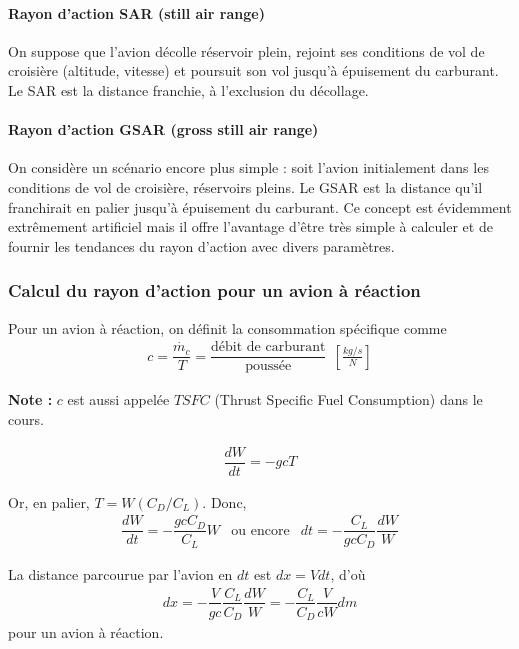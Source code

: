 \documentclass{report}
\begin{document}
\paragraph{Rayon d’action SAR (still air range)} On suppose que l’avion décolle réservoir
plein, rejoint ses conditions de vol de croisière (altitude, vitesse) et poursuit
son vol jusqu’à épuisement du carburant. Le SAR est la distance franchie,
à l’exclusion du décollage.

\paragraph{Rayon d’action GSAR (gross still air range)} On considère un scénario encore plus
simple : soit l’avion initialement dans les conditions de vol de croisière, réservoirs
pleins. Le GSAR est la distance qu’il franchirait en palier jusqu’à
épuisement du carburant. Ce concept est évidemment extrêmement artificiel
mais il offre l’avantage d’être très simple à calculer et de fournir les
tendances du rayon d’action avec divers paramètres.

\subsubsection{Calcul du rayon d'action pour un avion à réaction}


Pour un avion à réaction, on définit la consommation spécifique comme
\begin{eqnarray}
c = \dfrac{\dot{m_c}}{T}=\dfrac{\text{débit de carburant}}{\text{poussée}}~~[\frac{kg/s}{N}]
\end{eqnarray}

\textbf{Note :} $c$ est aussi appelée $TSFC$ (Thrust Specific Fuel Consumption) dans le cours.

\begin{eqnarray}
\dfrac{dW}{dt} = -gcT
\end{eqnarray}

Or, en palier, $T=W(C_D/C_L)$. Donc,
\begin{eqnarray}
\dfrac{dW}{dt} = -\dfrac{gcC_D}{C_L}W & \text{ou encore} & dt=-\dfrac{C_L}{gcC_D}\dfrac{dW}{W}
\end{eqnarray}

La distance parcourue par l'avion en $dt$ est $dx=Vdt$, d'où
\begin{eqnarray}
dx = -\dfrac{V}{gc}\dfrac{C_L}{C_D}\dfrac{dW}{W} = -\dfrac{C_L}{C_D}\dfrac{V}{c W}dm
\end{eqnarray}
pour un avion à réaction.
\end{document}
